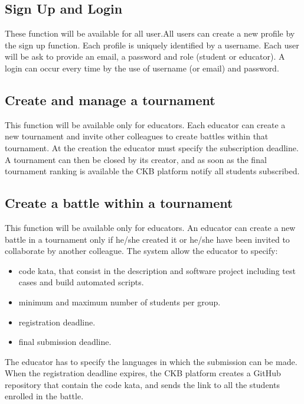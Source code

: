 \subsection{Sign Up and Login}
These function will be available for all user.\newline All users can create a new profile by the sign up function. Each profile is uniquely identified by a username. Each user will be ask to provide an email, a password and role (student or educator). \newline
A login can occur every time by the use of username (or email) and password.

\subsection{Create and manage a tournament}
This function will be available only for educators. \newline
Each educator can create a new tournament and invite other colleagues to create battles within that tournament. At the creation the educator must specify the subscription deadline. 
A tournament can then be closed by its creator, and as soon as the final tournament ranking is available the CKB platform notify all students subscribed.

\subsection{Create a battle within a tournament}
This function will be available only for educators. \newline 
An educator can create a new battle in a tournament only if he/she created it or he/she have been invited to collaborate by another colleague.
The system allow the educator to specify: 
\begin{itemize}
    \item code kata, that consist in the description and software project including test cases and build automated scripts.
    \item minimum and maximum number of students per group.
    \item registration deadline.
    \item final submission deadline.
\end{itemize}
The educator has to specify the languages in which the submission can be made.
When the registration deadline expires, the CKB platform creates a GitHub repository that contain the code kata, and sends the link to all the students enrolled in the battle.

